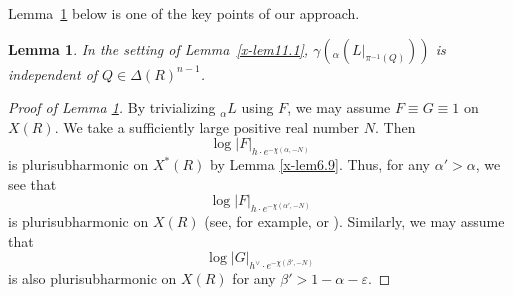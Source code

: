 \documentclass[12pt,twoside]{amsart}
\newtheorem{lem}[thm]{Lemma}
\theoremstyle{definition}
\begin{document}
Lemma~\ref{x-lem11.3} below is one of the key points of our approach.

\begin{lem}\label{x-lem11.3}
In the setting of Lemma~\ref{x-lem11.1},
$\gamma\!\left({}_\alpha(L|_{\pi^{-1}(Q)})\right)$ is independent of
$Q\in \Delta(R)^{n-1}$.
\end{lem}

\begin{proof}[Proof of Lemma \ref{x-lem11.3}]
By trivializing ${}_\alpha L$ using $F$, we may assume $F\equiv G\equiv1$ on $X(R)$. 
We take a sufficiently large positive real number $N$. 
Then 
\[
\log |F|_{h\cdot e^{-\chi (\alpha, -N)}}
\]
is plurisubharmonic on $X^*(R)$ by Lemma \ref{x-lem6.9}. 
Thus, for any $\alpha'>\alpha$, we see that 
\[
\log |F|_{h\cdot e^{-\chi (\alpha', -N)}}
\] 
is plurisubharmonic on $X(R)$ (see, for example, 
\cite[(3.3.41) Theorem]{noguchi-ochiai} or  
\cite[Chapter~I, (5.24) Theorem]{demailly}).
Similarly, we may assume that 
\[
\log |G|_{h^\vee \cdot e^{-\chi (\beta', -N)}}
\] is also plurisubharmonic on $X(R)$ for any $\beta'>1-\alpha-\varepsilon$. 


\end{proof}
\end{document}
